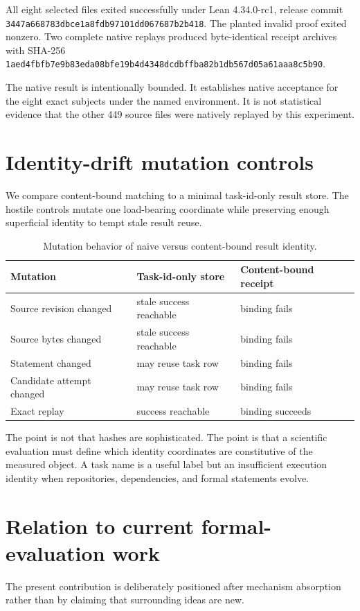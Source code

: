 \documentclass[11pt]{article}
\begin{document}
All eight selected files exited successfully under Lean 4.34.0-rc1, release commit \texttt{3447a668783dbce1a8fdb97101dd067687b2b418}. The planted invalid proof exited nonzero. Two complete native replays produced byte-identical receipt archives with SHA-256 \texttt{1aed4fbfb7e9b83eda08bfe19b4d4348dcdbffba82b1db567d05a61aaa8c5b90}.

The native result is intentionally bounded. It establishes native acceptance for the eight exact subjects under the named environment. It is not statistical evidence that the other 449 source files were natively replayed by this experiment.

\section{Identity-drift mutation controls}
We compare content-bound matching to a minimal task-id-only result store. The hostile controls mutate one load-bearing coordinate while preserving enough superficial identity to tempt stale result reuse.

\begin{table}[h]
\centering
\caption{Mutation behavior of naive versus content-bound result identity.}
\label{tab:mutation}
\begin{tabular}{lll}
\toprule
Mutation & Task-id-only store & Content-bound receipt \\
\midrule
Source revision changed & stale success reachable & binding fails \\
Source bytes changed & stale success reachable & binding fails \\
Statement changed & may reuse task row & binding fails \\
Candidate attempt changed & may reuse task row & binding fails \\
Exact replay & success reachable & binding succeeds \\
\bottomrule
\end{tabular}
\end{table}

The point is not that hashes are sophisticated. The point is that a scientific evaluation must define which identity coordinates are constitutive of the measured object. A task name is a useful label but an insufficient execution identity when repositories, dependencies, and formal statements evolve.

\section{Relation to current formal-evaluation work}
The present contribution is deliberately positioned after mechanism absorption rather than by claiming that surrounding ideas are new.
\end{document}

